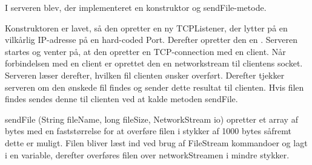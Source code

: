 I serveren blev, der implementeret en konstruktor og sendFile-metode.

Konstruktoren er lavet, så den opretter en ny TCPListener, der lytter på en vilkårlig IP-adresse på en hard-coded Port.
Derefter opretter den en . Serveren startes og venter på, at den opretter en TCP-connection med en client.
Når forbindelsen med en client er oprettet den en networkstream til clientens socket. Serveren læser derefter, hvilken fil clienten ønsker overført. 
Derefter tjekker serveren om den ønskede fil findes og sender dette resultat til clienten.
Hvis filen findes sendes denne til clienten ved at kalde metoden sendFile.

sendFile (String fileName, long fileSize, NetworkStream io) opretter et array af bytes med en faststørrelse for at overføre filen i stykker af 1000 bytes såfremt dette er muligt.
Filen bliver læst ind ved brug af FileStream kommandoer og lagt i en variable, derefter overføres filen over networkStreamen i mindre stykker.